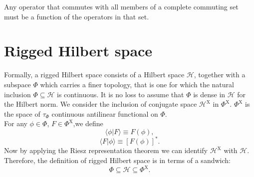 \begin{newthem}
Any operator that commutes with all members of a complete commuting set must be a function of the operators in that set.
\end{newthem}

\section{Rigged Hilbert space}
\begin{newdef}
Formally, a rigged Hilbert space consists of a Hilbert space $\mathcal{H}$, together with a subspace $\Phi$ which carries a finer topology, that is one for which the natural inclusion $\Phi \subseteq \mathcal{H}$ is continuous. 
It is no loss to assume that $\Phi$ is dense in $\mathcal{H}$ for the Hilbert norm. We consider the inclusion of conjugate space $\mathcal{H}^{\mathrm{X}}$ in $\Phi^{\mathrm{X}}$. $\Phi^{\mathrm{X}}$ is the space of $\tau_{\Phi}$ continuous antilinear functional on $\Phi$.\\
For any $\phi \in \Phi$, $F \in \Phi^{\mathrm{X}}$,we define
\[\langle \phi | F \rangle \equiv F(\phi),\]
\[\langle F | \phi \rangle \equiv [F(\phi)]^*.\]
Now by applying the Riesz representation theorem we can identify $\mathcal{H}^{\mathrm{X}}$ with $\mathcal{H}$. Therefore, the definition of rigged Hilbert space is in terms of a sandwich:
\[\Phi \subseteq \mathcal{H} \subseteq \Phi^{\mathrm{X}}.\]
\end{newdef}

